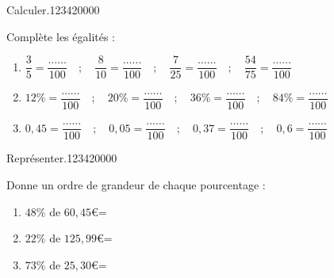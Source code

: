 \begin{pageAD} 


 

\begin{ExoCad}{ Calculer.}{1234}{2}{0}{0}{0}{0}

Complète les égalités :
\begin{enumerate}[leftmargin=*]
\item $\dfrac{3}{5} = \dfrac{\ldots\ldots}{100}  \quad;\quad \dfrac{8}{10} = \dfrac{\ldots\ldots}{100}  \quad;\quad \dfrac{7}{25} = \dfrac{\ldots\ldots}{100}  \quad;\quad \dfrac{54}{75} = \dfrac{\ldots\ldots}{100} $ \vspace{0.4cm}


\item $12 \% = \dfrac{\ldots\ldots}{100}  \quad;\quad 20 \% = \dfrac{\ldots\ldots}{100}  \quad;\quad 36 \% = \dfrac{\ldots\ldots}{100} \quad;\quad 84\% = \dfrac{\ldots\ldots}{100}$\vspace{0.4cm}
\item $0,45 = \dfrac{\ldots\ldots}{100}  \quad;\quad 0,05 = \dfrac{\ldots\ldots}{100}  \quad;\quad 0,37 = \dfrac{\ldots\ldots}{100} \quad;\quad 0,6 = \dfrac{\ldots\ldots}{100}$ 
\end{enumerate}

\end{ExoCad}




\begin{ExoCad}{Représenter.}{1234}{2}{0}{0}{0}{0}

Donne un ordre de grandeur de chaque pourcentage :
\begin{enumerate}[leftmargin=*]
\item  $48\%$ de $60,45$\euro =  
\item  $22\%$ de $125,99$\euro  =  
\item  $73\%$ de $25,30$\euro  =  
\end{enumerate}
\end{ExoCad}
 



\end{pageAD}
